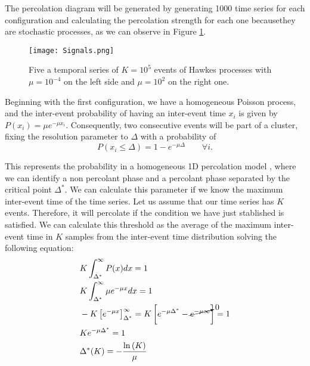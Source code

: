 The percolation diagram will be generated by generating 1000 time series for each configuration and calculating the percolation strength for each one becausethey are stochastic
processes, as we can observe in Figure \ref{f: Hawkes not stationary}.

\begin{figure}[H]
    \centering
    \texttt{[image: Signals.png]}
    \caption{Five a temporal series of $K=10^5$ events of Hawkes processes with $\mu=10^{-4}$ on the left side and $\mu = 10^2$ on the right one.}
    \label{f: Hawkes not stationary}
\end{figure}

Beginning with the first configuration, we have a homogeneous Poisson process, and the inter-event probability of having an inter-event
time $x_i$ is given by $P(x_i)=\mu e^{-\mu x_i}$. Consequently, two consecutive events will be part of a cluster, fixing the resolution parameter to $\Delta$ with a probability of
\begin{equation}
    P(x_i\leq \Delta)=1-e^{-\mu\Delta}\quad\quad \forall i.
    \label{eq: Poisson prob of cluster of size 2}
\end{equation}

This represents the probability in a homogeneous 1D percolation model \cite{stauffer2018introduction}, where we can identify a non percolant phase and a percolant phase separated by the
critical point $\Delta^*$. We can calculate this parameter if we know the maximum inter-event time of the time series. Let us assume that our time series has $K$ events. Therefore, it will 
percolate if the condition we have just stablished is satisfied. We can calculate this threshold as the average of the maximum inter-event time in $K$ samples from the 
inter-event time distribution solving the following equation:
\begin{equation}
    \begin{split}
        &K\int_{\Delta^*}^{\infty}P(x) dx=1\\
        &K\int_{\Delta^*}^{\infty}\mu e^{-\mu x}dx=1\\
        &-K\left[ e^{-\mu x} \right]_{\Delta^*}^{\infty}=K\left[ e^{-\mu\Delta^*} - \cancelto{0}{e^{-\mu\infty}} \right]=1\\
        &K e^{-\mu\Delta^*}=1\\
        &\Delta^*(K)=-\dfrac{\ln\left(K \right)}{\mu}
    \end{split}
    \label{eq: critical point}
\end{equation}

